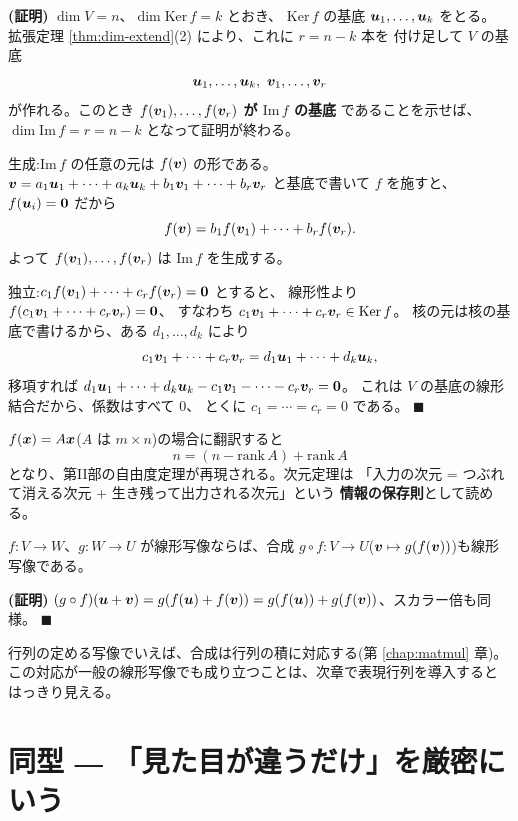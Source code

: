 \noindent\textbf{(証明)}\quad
$\dim V = n$、$\dim \mathrm{Ker}\,f = k$ とおき、
$\mathrm{Ker}\,f$ の基底 $\bm{u}_1, \dots, \bm{u}_k$ をとる。
拡張定理 \ref{thm:dim-extend}(2) により、これに $r = n - k$ 本を
付け足して $V$ の基底
\[
\vect{u}_1, \dots, \vect{u}_k,\ \vect{v}_1, \dots, \vect{v}_r
\]
が作れる。このとき
\textbf{$f(\bm{v}_1), \dots, f(\bm{v}_r)$ が $\mathrm{Im}\,f$ の基底}
であることを示せば、$\dim \mathrm{Im}\,f = r = n - k$ となって証明が終わる。

生成:$\mathrm{Im}\,f$ の任意の元は $f(\bm{v})$ の形である。
$\bm{v} = a_1\bm{u}_1 + \cdots + a_k\bm{u}_k
+ b_1\bm{v}_1 + \cdots + b_r\bm{v}_r$ と基底で書いて $f$ を施すと、
$f(\bm{u}_i) = \bm{0}$ だから
\[
f(\bm{v}) = b_1 f(\bm{v}_1) + \cdots + b_r f(\bm{v}_r).
\]
よって $f(\bm{v}_1), \dots, f(\bm{v}_r)$ は $\mathrm{Im}\,f$ を生成する。

独立:$c_1 f(\bm{v}_1) + \cdots + c_r f(\bm{v}_r) = \bm{0}$ とすると、
線形性より $f(c_1\bm{v}_1 + \cdots + c_r\bm{v}_r) = \bm{0}$、
すなわち $c_1\bm{v}_1 + \cdots + c_r\bm{v}_r \in \mathrm{Ker}\,f$。
核の元は核の基底で書けるから、ある $d_1, \dots, d_k$ により
\[
c_1\bm{v}_1 + \cdots + c_r\bm{v}_r
= d_1\bm{u}_1 + \cdots + d_k\bm{u}_k,
\]
移項すれば
$d_1\bm{u}_1 + \cdots + d_k\bm{u}_k - c_1\bm{v}_1 - \cdots
- c_r\bm{v}_r = \bm{0}$。
これは $V$ の基底の線形結合だから、係数はすべて $0$、
とくに $c_1 = \cdots = c_r = 0$ である。 $\blacksquare$

$f(\bm{x}) = A\bm{x}$($A$ は $m \times n$)の場合に翻訳すると
\[
n = (n - \mathrm{rank}\,A) + \mathrm{rank}\,A
\]
となり、第II部の自由度定理が再現される。次元定理は
「入力の次元 = つぶれて消える次元 + 生き残って出力される次元」という
\textbf{情報の保存則}として読める。

\begin{teiri}[合成写像の線形性]\label{thm:linmap-comp}
$f : V \to W$、$g : W \to U$ が線形写像ならば、合成
$g \circ f : V \to U$($\bm{v} \mapsto g(f(\bm{v}))$)も線形写像である。
\end{teiri}

\noindent\textbf{(証明)}\quad
$(g \circ f)(\bm{u} + \bm{v}) = g(f(\bm{u}) + f(\bm{v}))
= g(f(\bm{u})) + g(f(\bm{v}))$、スカラー倍も同様。 $\blacksquare$

行列の定める写像でいえば、合成は行列の積に対応する(第 \ref{chap:matmul} 章)。
この対応が一般の線形写像でも成り立つことは、次章で表現行列を導入すると
はっきり見える。

\section{同型 ― 「見た目が違うだけ」を厳密にいう}

